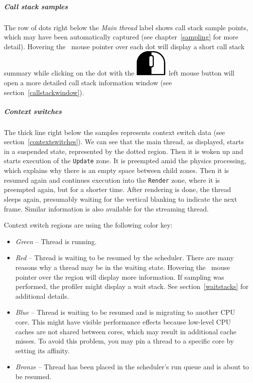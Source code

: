 \documentclass[hidelinks,titlepage,a4paper]{article}
\newcommand{\LMB}{\includegraphics[height=.8\baselineskip]{icons/lmb}}
\begin{document}
\subparagraph{Call stack samples}

The row of dots right below the \emph{Main thread} label shows call stack sample points, which may have been automatically captured (see chapter~\ref{sampling} for more detail). Hovering the \faMousePointer{}~mouse pointer over each dot will display a short call stack summary while clicking on the dot with the \LMB{}~left mouse button will open a more detailed call stack information window (see section~\ref{callstackwindow}).

\subparagraph{Context switches}

The thick line right below the samples represents context switch data (see section~\ref{contextswitches}). We can see that the main thread, as displayed, starts in a suspended state, represented by the dotted region. Then it is woken up and starts execution of the \texttt{Update} zone. It is preempted amid the physics processing, which explains why there is an empty space between child zones. Then it is resumed again and continues execution into the \texttt{Render} zone, where it is preempted again, but for a shorter time. After rendering is done, the thread sleeps again, presumably waiting for the vertical blanking to indicate the next frame. Similar information is also available for the streaming thread.

Context switch regions are using the following color key:

\begin{itemize}
\item \emph{Green} -- Thread is running.
\item \emph{Red} -- Thread is waiting to be resumed by the scheduler. There are many reasons why a thread may be in the waiting state. Hovering the \faMousePointer{}~mouse pointer over the region will display more information. If sampling was performed, the profiler might display a wait stack. See section~\ref{waitstacks} for additional details.
\item \emph{Blue} -- Thread is waiting to be resumed and is migrating to another CPU core. This might have visible performance effects because low-level CPU caches are not shared between cores, which may result in additional cache misses. To avoid this problem, you may pin a thread to a specific core by setting its affinity.
\item \emph{Bronze} -- Thread has been placed in the scheduler's run queue and is about to be resumed.
\end{itemize}
\end{document}
